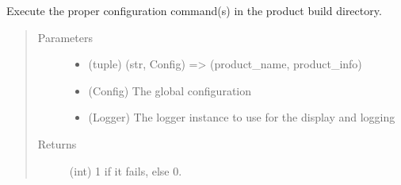 \documentclass[a4paper,10pt,english]{sphinxmanual}
\begin{document}
\begin{fulllineitems}
\label{\detokenize{apidoc_commands/commands:commands.check.check_product}}
Execute the proper configuration command(s) 
in the product build directory.
\begin{quote}\begin{description}
\item[{Parameters}] \leavevmode\begin{itemize}
\item {} 
 \textendash{} (tuple) 
(str, Config) =\textgreater{} (product\_name, product\_info)

\item {} 
 \textendash{} (Config) The global configuration

\item {} 
 \textendash{} (Logger) 
The logger instance to use for the display and logging

\end{itemize}

\item[{Returns}] \leavevmode
(int) 1 if it fails, else 0.

\end{description}\end{quote}

\end{fulllineitems}

\end{document}
